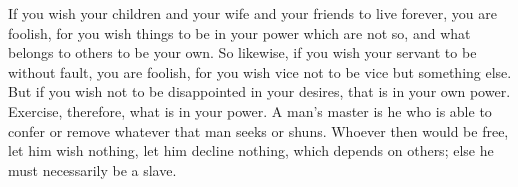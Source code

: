 If you wish your  children and your wife and your friends  to live forever, you
are foolish, for you wish things to be in your power which are not so, and what
belongs to others to  be your own. So likewise, if you wish  your servant to be
without fault, you are foolish, for you  wish vice not to be vice but something
else. But if you  wish not to be disappointed in your desires,  that is in your
own power. Exercise, therefore, what is in your power. A man's master is he who
is able  to confer  or remove whatever  that man seeks  or shuns.  Whoever then
would be free, let him wish nothing,  let him decline nothing, which depends on
others; else he must necessarily be a slave.
